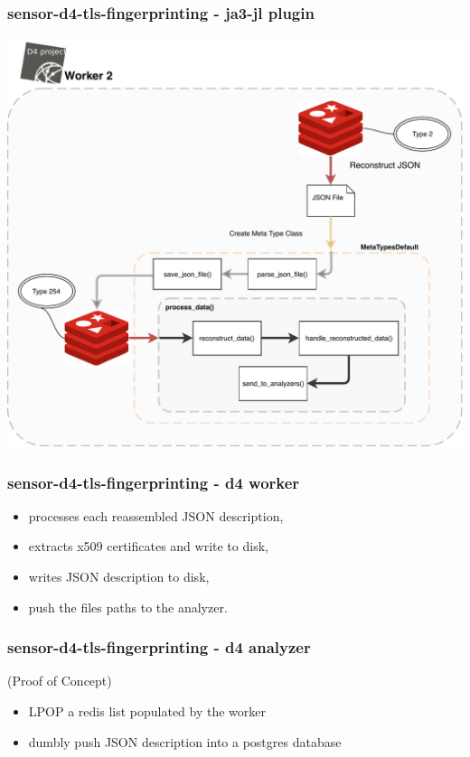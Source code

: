 \documentclass{beamer}
\begin{document}
\begin{frame}
        \frametitle{sensor-d4-tls-fingerprinting - ja3-jl plugin} 
              \begin{center}
                \includegraphics[scale=0.4]{d4-worker2-ja3-jl.pdf}
              \end{center}
\end{frame}

\begin{frame}[fragile]
        \frametitle{sensor-d4-tls-fingerprinting - d4 worker} 
        
        \begin{itemize}
          \item processes each reassembled JSON description,
          \item extracts x509 certificates and write to disk,
          \item writes JSON description to disk,
          \item push the files paths to the analyzer.
        \end{itemize}
\end{frame}

\begin{frame}[fragile]
        \frametitle{sensor-d4-tls-fingerprinting - d4 analyzer} 
        (Proof of Concept)
        \begin{itemize}
          \item LPOP a redis list populated by the worker
          \item dumbly push JSON description into a postgres database
        \end{itemize}
\end{frame}
\end{document}
